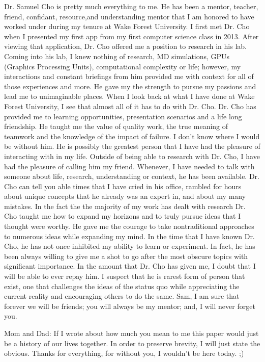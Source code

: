 \documentclass[paper=letter, fontsize=11pt]{scrartcl}
\numberwithin{equation}{section}		%
\numberwithin{figure}{section}			%
\numberwithin{table}{section}				%
\begin{document}
\begin{spacing}{2}
Dr. Samuel Cho is pretty much everything to me. He has been a mentor, teacher, friend, confidant, resource,and understanding mentor that I am honored to have worked under during my tenure at Wake Forest University. I first met Dr. Cho when I presented my first app from my first computer science class in 2013. After viewing that application, Dr. Cho offered me a position to research in his lab. Coming into his lab, I knew nothing of research, MD simulations, GPUs (Graphics Processing Units), computational complexity or life; however, my interactions and constant briefings from him provided me with context for all of those experiences and more. He gave my the strength to pursue my passions and lead me to unimaginable places. When I look back at what I have done at Wake Forest University, I see that almost all of it has to do with Dr. Cho. Dr. Cho has provided me to learning opportunities, presentation scenarios and a life long friendship. He taught me the value of quality work, the true meaning of teamwork and the knowledge of the impact of failure. I don't know where I would be without him. He is possibly the greatest person that I have had the pleasure of interacting with in my life. Outside of being able to research with Dr. Cho, I have had the pleasure of calling him my friend. Whenever, I have needed to talk with someone about life, research, understanding or context, he has been available. Dr. Cho can tell you able times that I have cried in his office, rambled for hours about unique concepts that he already was an expert in, and about my many mistakes. In the fact the the majority of my work has dealt with research Dr. Cho taught me how to expand my horizons and to truly pursue ideas that I thought were worthy. He gave me the courage to take nontraditional approaches to numerous ideas while expanding my mind. In the time that I have known Dr. Cho, he has not once inhibited my ability to learn or experiment. In fact, he has been always willing to give me a shot to go after the most obscure topics with significant importance. In the amount that Dr. Cho has given me, I doubt that I will be able to ever repay him. I suspect that he is rarest form of person that exist, one that challenges the ideas of the status quo while appreciating the current reality and encouraging others to do the same.  Sam, I am sure that forever we will be friends; you will always be my mentor; and, I will never forget you. 

Mom and Dad: If I wrote about how much you mean to me this paper would just be a history of our lives together. In order to preserve brevity, I will just state the obvious. Thanks for everything, for without you, I wouldn't be here today. ;)

\end{spacing}
\end{document}

